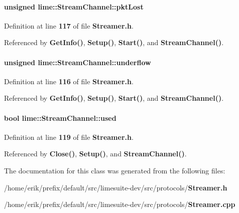 \paragraph[{pkt\+Lost}]{\setlength{\rightskip}{0pt plus 5cm}unsigned lime\+::\+Stream\+Channel\+::pkt\+Lost}\label{classlime_1_1StreamChannel_a29f5c63dbde00e288f486b7a12719b45}


Definition at line {\bf 117} of file {\bf Streamer.\+h}.



Referenced by {\bf Get\+Info()}, {\bf Setup()}, {\bf Start()}, and {\bf Stream\+Channel()}.

\paragraph[{underflow}]{\setlength{\rightskip}{0pt plus 5cm}unsigned lime\+::\+Stream\+Channel\+::underflow}\label{classlime_1_1StreamChannel_af3f2002651bda8d3f56dff2d659fe7f2}


Definition at line {\bf 116} of file {\bf Streamer.\+h}.



Referenced by {\bf Get\+Info()}, {\bf Setup()}, {\bf Start()}, and {\bf Stream\+Channel()}.

\paragraph[{used}]{\setlength{\rightskip}{0pt plus 5cm}bool lime\+::\+Stream\+Channel\+::used}\label{classlime_1_1StreamChannel_a31a5675002ab56ae3ebc5cf256916876}


Definition at line {\bf 119} of file {\bf Streamer.\+h}.



Referenced by {\bf Close()}, {\bf Setup()}, and {\bf Stream\+Channel()}.



The documentation for this class was generated from the following files\+:\begin{DoxyCompactItemize}
\item 
/home/erik/prefix/default/src/limesuite-\/dev/src/protocols/{\bf Streamer.\+h}\item 
/home/erik/prefix/default/src/limesuite-\/dev/src/protocols/{\bf Streamer.\+cpp}\end{DoxyCompactItemize}
